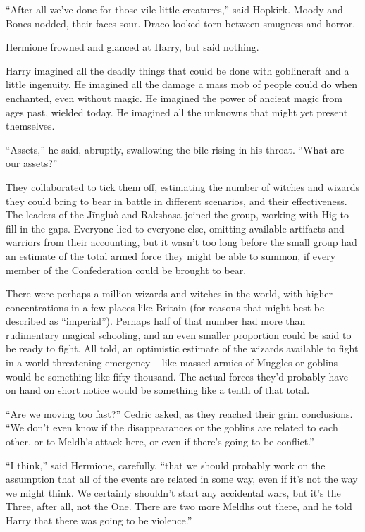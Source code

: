 ``After all we've done for those vile little creatures,'' said Hopkirk.
Moody and Bones nodded, their faces sour. Draco looked torn between
smugness and horror.

Hermione frowned and glanced at Harry, but said nothing.

Harry imagined all the deadly things that could be done with goblincraft
and a little ingenuity. He imagined all the damage a mass mob of people
could do when enchanted, even without magic. He imagined the power of
ancient magic from ages past, wielded today. He imagined all the
unknowns that might yet present themselves.

``Assets,'' he said, abruptly, swallowing the bile rising in his throat.
``What are our assets?''

They collaborated to tick them off, estimating the number of witches and
wizards they could bring to bear in battle in different scenarios, and
their effectiveness. The leaders of the Jīngluò and Rakshasa joined the
group, working with Hig to fill in the gaps. Everyone lied to everyone
else, omitting available artifacts and warriors from their accounting,
but it wasn't too long before the small group had an estimate of the
total armed force they might be able to summon, if every member of the
Confederation could be brought to bear.

There were perhaps a million wizards and witches in the world, with
higher concentrations in a few places like Britain (for reasons that
might best be described as ``imperial''). Perhaps half of that number
had more than rudimentary magical schooling, and an even smaller
proportion could be said to be ready to fight. All told, an optimistic
estimate of the wizards available to fight in a world-threatening
emergency -- like massed armies of Muggles or goblins -- would be
something like fifty thousand. The actual forces they'd probably have on
hand on short notice would be something like a tenth of that total.

``Are we moving too fast?'' Cedric asked, as they reached their grim
conclusions. ``We don't even know if the disappearances or the goblins
are related to each other, or to Meldh's attack here, or even if there's
going to be conflict.''

``I think,'' said Hermione, carefully, ``that we should probably work on
the assumption that all of the events are related in some way, even if
it's not the way we might think. We certainly shouldn't start any
accidental wars, but it's the Three, after all, not the One. There are
two more Meldhs out there, and he told Harry that there was going to be
violence.''

